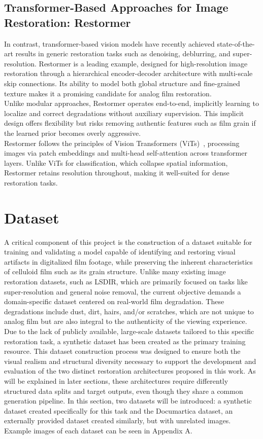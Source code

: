 \documentclass[10pt,a4paper,twocolumn,twoside]{article}
\begin{document}
\subsection{Transformer-Based Approaches for Image Restoration: Restormer}
In contrast, transformer-based vision models have recently achieved state-of-the-art results in generic restoration tasks such as denoising, deblurring, and super-resolution. Restormer is a leading example, designed for high-resolution image restoration through a hierarchical encoder-decoder architecture with multi-scale skip connections. Its ability to model both global structure and fine-grained texture makes it a promising candidate for analog film restoration. \\
Unlike modular approaches, Restormer operates end-to-end, implicitly learning to localize and correct degradations without auxiliary supervision. This implicit design offers flexibility but risks removing authentic features such as film grain if the learned prior becomes overly aggressive. \\
Restormer follows the principles of Vision Transformers (ViTs)~\cite{dosovitskiy2020image}, processing images via patch embeddings and multi-head self-attention across transformer layers. Unlike ViTs for classification, which collapse spatial information, Restormer retains resolution throughout, making it well-suited for dense restoration tasks.


\section{Dataset}
\label{sec:dataset}
A critical component of this project is the construction of a dataset suitable for training and validating a model capable of identifying and restoring visual artifacts in digitalized film footage, while preserving the inherent characteristics of celluloid film such as its grain structure. Unlike many existing image restoration datasets, such as LSDIR, which are primarily focused on tasks like super-resolution and general noise removal, the current objective demands a domain-specific dataset centered on real-world film degradation. These degradations include dust, dirt, hairs, and/or scratches, which are not unique to analog film but are also integral to the authenticity of the viewing experience. \\
Due to the lack of publicly available, large-scale datasets tailored to this specific restoration task, a synthetic dataset has been created as the primary training resource. This dataset construction process was designed to ensure both the visual realism and structural diversity necessary to support the development and evaluation of the two distinct restoration architectures proposed in this work. As will be explained in later sections, these architectures require differently structured data splits and target outputs, even though they share a common generation pipeline. In this section, two datasets will be introduced: a synthetic dataset created specifically for this task and the Documartica dataset, an externally provided dataset created similarly, but with unrelated images. Example images of each dataset can be seen in Appendix A.
\end{document}

